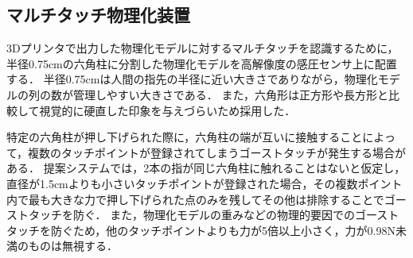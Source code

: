 \documentclass[a4paper,10pt,twocolumn,uplatex]{jsarticle}
\begin{document}
\subsection{マルチタッチ物理化装置}
\label{マルチタッチ物理化装置}
3Dプリンタで出力した物理化モデルに対するマルチタッチを認識するために，半径0.75cmの六角柱に分割した物理化モデルを高解像度の感圧センサ上に配置する．
半径0.75cmは人間の指先の半径に近い大きさでありながら，物理化モデルの列の数が管理しやすい大きさである．
また，六角形は正方形や長方形と比較して視覚的に硬直した印象を与えづらいため採用した．\par
特定の六角柱が押し下げられた際に，六角柱の端が互いに接触することによって，複数のタッチポイントが登録されてしまうゴーストタッチが発生する場合がある．
提案システムでは，2本の指が同じ六角柱に触れることはないと仮定し，直径が1.5cmよりも小さいタッチポイントが登録された場合，その複数ポイント内で最も大きな力で押し下げられた点のみを残してその他は排除することでゴーストタッチを防ぐ．
また，物理化モデルの重みなどの物理的要因でのゴーストタッチを防ぐため，他のタッチポイントよりも力が5倍以上小さく，力が0.98N未満のものは無視する．


\end{document}

